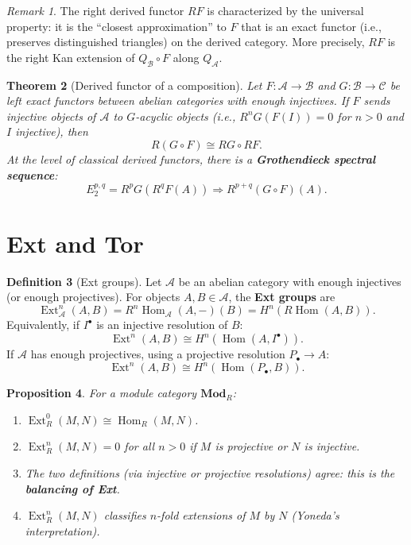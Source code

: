 \documentclass[a4paper,12pt]{book}
\DeclareMathOperator{\Hom}{Hom}
\newcommand{\Mod}{\mathbf{Mod}}
\theoremstyle{definition}
\newtheorem{definition}{Definition}[section]
\theoremstyle{plain}
\newtheorem{theorem}[definition]{Theorem}
\newtheorem{proposition}[definition]{Proposition}
\theoremstyle{remark}
\newtheorem{remark}[definition]{Remark}
\begin{document}
\begin{remark}\label{rem:derived-universal}
The right derived functor $RF$ is characterized by the universal property: it is the
``closest approximation'' to $F$ that is an exact functor (i.e., preserves distinguished
triangles) on the derived category. More precisely, $RF$ is the right Kan extension
of $Q_{\mathcal{B}} \circ F$ along $Q_{\mathcal{A}}$.
\end{remark}

\begin{theorem}[Derived functor of a composition]\label{thm:grothendieck-spectral}
Let $F \colon \mathcal{A} \to \mathcal{B}$ and $G \colon \mathcal{B} \to \mathcal{C}$
be left exact functors between abelian categories with enough injectives. If $F$ sends
injective objects of $\mathcal{A}$ to $G$-acyclic objects (i.e., $R^n G(F(I)) = 0$ for
$n > 0$ and $I$ injective), then
\[
    R(G \circ F) \cong RG \circ RF.
\]
At the level of classical derived functors, there is a \textbf{Grothendieck spectral sequence}:
\[
    E_2^{p,q} = R^p G(R^q F(A)) \Longrightarrow R^{p+q}(G \circ F)(A).
\]
\end{theorem}


\section{Ext and Tor}\label{sec:ext-tor}

\begin{definition}[Ext groups]\label{def:ext}
Let $\mathcal{A}$ be an abelian category with enough injectives (or enough projectives).
For objects $A, B \in \mathcal{A}$, the \textbf{Ext groups} are
\[
    \operatorname{Ext}^n_{\mathcal{A}}(A, B) = R^n \Hom_{\mathcal{A}}(A, -)(B)
    = H^n(R\Hom(A, B)).
\]
Equivalently, if $I^\bullet$ is an injective resolution of $B$:
\[
    \operatorname{Ext}^n(A, B) \cong H^n(\Hom(A, I^\bullet)).
\]
If $\mathcal{A}$ has enough projectives, using a projective resolution $P_\bullet \to A$:
\[
    \operatorname{Ext}^n(A, B) \cong H^n(\Hom(P_\bullet, B)).
\]
\end{definition}

\begin{proposition}\label{prop:ext-properties}
For a module category $\Mod_R$:
\begin{enumerate}
    \item $\operatorname{Ext}^0_R(M, N) \cong \Hom_R(M, N)$.
    \item $\operatorname{Ext}^n_R(M, N) = 0$ for all $n > 0$ if $M$ is projective or $N$
    is injective.
    \item The two definitions (via injective or projective resolutions) agree: this is
    the \textbf{balancing of Ext}.
    \item $\operatorname{Ext}^n_R(M, N)$ classifies $n$-fold extensions of $M$ by $N$
    (Yoneda's interpretation).
\end{enumerate}
\end{proposition}
\end{document}
